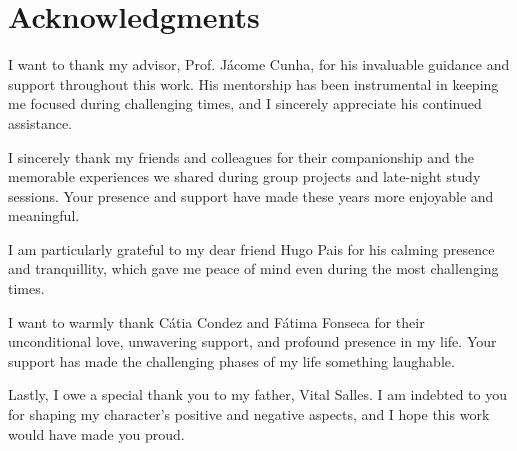 \chapter*{Acknowledgments}

I want to thank my advisor, Prof. Jácome Cunha, for his invaluable guidance and
support throughout this work. His mentorship has been instrumental in keeping
me focused during challenging times, and I sincerely appreciate his continued
assistance.

I sincerely thank my friends and colleagues for their companionship and the
memorable experiences we shared during group projects and late-night study
sessions. Your presence and support have made these years more enjoyable and
meaningful.

I am particularly grateful to my dear friend Hugo Pais for his calming presence
and tranquillity, which gave me peace of mind even during the most challenging
times.

I want to warmly thank Cátia Condez and Fátima Fonseca for their unconditional
love, unwavering support, and profound presence in my life. Your support has
made the challenging phases of my life something laughable.

Lastly, I owe a special thank you to my father, Vital Salles. I am indebted to
you for shaping my character's positive and negative aspects, and I hope this
work would have made you proud.

\vspace{10mm}
